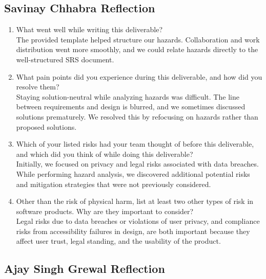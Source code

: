 \documentclass[12pt]{article}
\begin{document}
\subsection{Savinay Chhabra Reflection}

\begin{enumerate}
  \item What went well while writing this deliverable?\\
  The provided template helped structure our hazards. Collaboration and
  work distribution went more smoothly, and we could relate hazards
  directly to the well-structured SRS document.

  \item What pain points did you experience during this deliverable, and how
  did you resolve them?\\
  Staying solution-neutral while analyzing hazards was difficult. The line
  between requirements and design is blurred, and we sometimes discussed
  solutions prematurely. We resolved this by refocusing on hazards rather
  than proposed solutions.

  \item Which of your listed risks had your team thought of before this
  deliverable, and which did you think of while doing this deliverable?\\
  Initially, we focused on privacy and legal risks associated with data
  breaches. While performing hazard analysis, we discovered additional
  potential risks and mitigation strategies that were not previously
  considered.

  \item Other than the risk of physical harm, list at least two other types
  of risk in software products. Why are they important to consider?\\
  Legal risks due to data breaches or violations of user privacy, and
  compliance risks from accessibility failures in design, are both
  important because they affect user trust, legal standing, and the
  usability of the product.
\end{enumerate}

\subsection{Ajay Singh Grewal Reflection}
\end{document}
